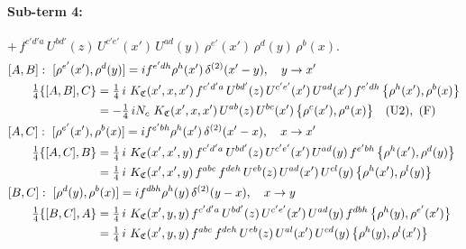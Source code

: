 \documentclass[10pt]{article}
\numberwithin{equation}{section}
\begin{document}
\paragraph{Sub-term 4:} $+\,f^{c'd'a}\,U^{bd'}(z)\,U^{c'e'}(x')\,U^{ad}(y)\,\rho^{e'}(x')\,\rho^{d}(y)\,\rho^{b}(x)$.
\begin{align}
&[A,B]:\ [\rho^{e'}(x'),\rho^{d}(y)]=i f^{e'dh}\rho^{h}(x')\,\delta^{(2)}(x'-y),\quad y\to x'\notag\\
&\qquad \tfrac14\{[A,B],C\}=\tfrac14\,i\,\,K_{\mathfrak C}(x',x,x')\,f^{c'd'a}\,U^{bd'}(z)\,U^{c'e'}(x')\,U^{ad}(x')\,f^{e'dh}\,\big\{\rho^{h}(x'),\rho^{b}(x)\big\}\notag\\
&\qquad\phantom{\tfrac14\{[A,B],C\}}=-\tfrac14\,i N_{c}\,\,K_{\mathfrak C}(x',x,x')\,U^{ab}(z)\,U^{bc}(x')\,\big\{\rho^{c}(x'),\rho^{a}(x)\big\}\quad\text{(U2)},\ \text{(F)}
\label{R:eq:GIII.VI-4-AB}\\
&[A,C]:\ [\rho^{e'}(x'),\rho^{b}(x)]=i f^{e'bh}\rho^{h}(x')\,\delta^{(2)}(x'-x),\quad x\to x'\notag\\
&\qquad \tfrac14\{[A,C],B\}=\tfrac14\,i\,\,K_{\mathfrak C}(x',x',y)\,f^{c'd'a}\,U^{bd'}(z)\,U^{c'e'}(x')\,U^{ad}(y)\,f^{e'bh}\,\big\{\rho^{h}(x'),\rho^{d}(y)\big\}\notag\\
&\qquad\phantom{\tfrac14\{[A,C],B\}}=\tfrac14\,i\,\,K_{\mathfrak C}(x',x',y)\,f^{abc}\,f^{deh}\,U^{eb}(z)\,U^{ad}(x')\,U^{cl}(y)\,\big\{\rho^{h}(x'),\rho^{l}(y)\big\}
\label{R:eq:GIII.VI-4-AC}\\
&[B,C]:\ [\rho^{d}(y),\rho^{b}(x)]=i f^{dbh}\rho^{h}(y)\,\delta^{(2)}(y-x),\quad x\to y\notag\\
&\qquad \tfrac14\{[B,C],A\}=\tfrac14\,i\,\,K_{\mathfrak C}(x',y,y)\,f^{c'd'a}\,U^{bd'}(z)\,U^{c'e'}(x')\,U^{ad}(y)\,f^{dbh}\,\big\{\rho^{h}(y),\rho^{e'}(x')\big\}\notag\\
&\qquad\phantom{\tfrac14\{[B,C],A\}}=\tfrac14\,i\,\,K_{\mathfrak C}(x',y,y)\,f^{abc}\,f^{deh}\,U^{eb}(z)\,U^{al}(x')\,U^{cd}(y)\,\big\{\rho^{h}(y),\rho^{l}(x')\big\}
\label{R:eq:GIII.VI-4-BC}
\end{align}
\end{document}
